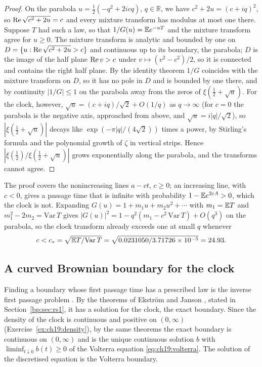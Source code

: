 \begin{proof}
On the parabola $u=\tfrac12(-q^2+2icq)$, $q\in\mathbb R$, we have $c^2+2u=(c+iq)^2$, so $\operatorname{Re}\sqrt{c^2+2u}=c$ and every mixture transform has modulus at most one there. Suppose $T$ had such a law, so that $1/G(u)=\mathbb{E} e^{-uT}$ and the mixture transform agree for $u\ge0$. The mixture transform is analytic and bounded by one on $D=\{u:\operatorname{Re}\sqrt{c^2+2u}>c\}$ and continuous up to its boundary, the parabola; $D$ is the image of the half plane $\operatorname{Re} v>c$ under $v\mapsto(v^2-c^2)/2$, so it is connected and contains the right half plane. By the identity theorem $1/G$ coincides with the mixture transform on $D$, so it has no pole in $D$ and is bounded by one there, and by continuity $|1/G|\le1$ on the parabola away from the zeros of $\xi(\tfrac12+\sqrt u)$. For the clock, however, $\sqrt u=(c+iq)/\sqrt2+O(1/q)$ as $q\to\infty$ (for $c=0$ the parabola is the negative axis, approached from above, and $\sqrt u=i|q|/\sqrt2$), so $|\xi(\tfrac12+\sqrt u)|$ decays like $\exp(-\pi|q|/(4\sqrt2))$ times a power, by Stirling's formula and the polynomial growth of $\zeta$ in vertical strips. Hence $|\xi(\tfrac12)/\xi(\tfrac12+\sqrt u)|$ grows exponentially along the parabola, and the transforms cannot agree.
\end{proof}

The proof covers the nonincreasing lines $a-ct$, $c\ge0$; an increasing line, with $c<0$, gives a passage time that is infinite with probability $1-\mathbb{E} e^{2cA}>0$, which the clock is not. Expanding $G(u)=1+m_1u+m_2u^2+\cdots$ with $m_1=\mathbb{E} T$ and $m_1^2-2m_2=\mathrm{Var}\,T$ gives $|G(u)|^2=1-q^2(m_1-c^2\,\mathrm{Var}\,T)+O(q^3)$ on the parabola, so the clock transform already exceeds one at small $q$ whenever
\[
c<c_*=\sqrt{\mathbb{E} T/\mathrm{Var}\,T}=\sqrt{0.0231050/3.71726\times10^{-5}}=24.93 .
\]


\subsection{A curved Brownian boundary for the clock}\label{sec:hitting}

Finding a boundary whose first passage time has a prescribed law is the inverse first passage problem \cite[Theorem 1]{CCCS11}. By the theorems of Ekstr\"om and Janson \cite[Theorems 2.3, 8.2 and 9.2]{EkstromJanson16}, stated in Section~\ref{bp:sec:rs1}, it has a solution for the clock, the exact boundary. Since the density of the clock is continuous and positive on $(0,\infty)$ (Exercise~\ref{ex:ch19:density}), by the same theorems the exact boundary is continuous on $(0,\infty)$ and is the unique continuous solution $b$ with $\liminf_{t\downarrow0}b(t)\ge0$ of the Volterra equation \eqref{eq:ch19:volterra}. The solution of the discretised equation is the Volterra boundary.

